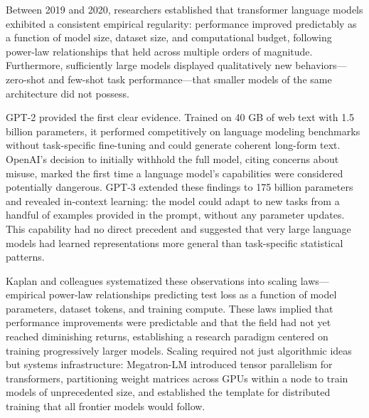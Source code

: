 
Between 2019 and 2020, researchers established that transformer language models exhibited a consistent empirical regularity: performance improved predictably as a function of model size, dataset size, and computational budget, following power-law relationships that held across multiple orders of magnitude. Furthermore, sufficiently large models displayed qualitatively new behaviors---zero-shot and few-shot task performance---that smaller models of the same architecture did not possess.

GPT-2 provided the first clear evidence. Trained on 40 GB of web text with 1.5 billion parameters, it performed competitively on language modeling benchmarks without task-specific fine-tuning and could generate coherent long-form text. OpenAI's decision to initially withhold the full model, citing concerns about misuse, marked the first time a language model's capabilities were considered potentially dangerous. GPT-3 extended these findings to 175 billion parameters and revealed in-context learning: the model could adapt to new tasks from a handful of examples provided in the prompt, without any parameter updates. This capability had no direct precedent and suggested that very large language models had learned representations more general than task-specific statistical patterns.

Kaplan and colleagues systematized these observations into scaling laws---empirical power-law relationships predicting test loss as a function of model parameters, dataset tokens, and training compute. These laws implied that performance improvements were predictable and that the field had not yet reached diminishing returns, establishing a research paradigm centered on training progressively larger models. Scaling required not just algorithmic ideas but systems infrastructure: Megatron-LM introduced tensor parallelism for transformers, partitioning weight matrices across GPUs within a node to train models of unprecedented size, and established the template for distributed training that all frontier models would follow.

